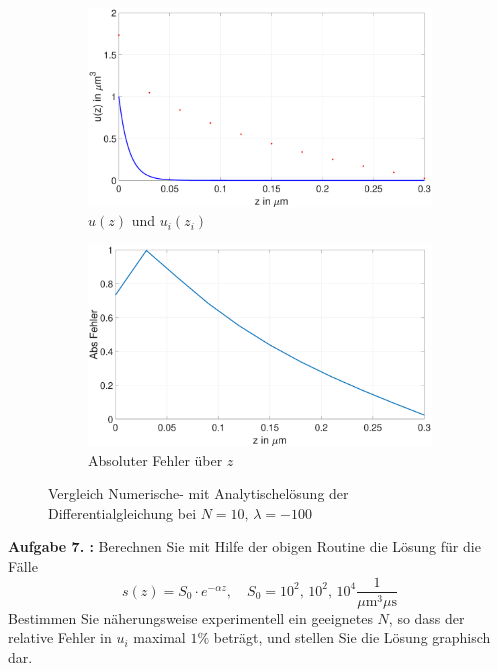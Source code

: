  \begin{figure}[]
 	\begin{subfigure}[b]{0.5\textwidth}
 		\includegraphics[width=\textwidth]{figures/station_gl_2_1/test_n10_l100}
 		\caption{$u(z)$ und $u_{i}(z_i)$}
 	\end{subfigure}
 	\hfill
 	\begin{subfigure}[b]{0.5\textwidth}
 		\includegraphics[width=1\linewidth]{figures/station_gl_2_1/test_n10_l100_fehler}
 		\caption{Absoluter Fehler über $z$}
 	\end{subfigure}
 	\caption{Vergleich Numerische- mit Analytischelösung der Differentialgleichung bei $N=10,\,\lambda=-100$}
\end{figure}
\begin{figure}
	
\end{figure}
\clearpage
\begin{mybox}
	\textbf{Aufgabe 7. :}	Berechnen Sie mit Hilfe der obigen Routine die Lösung
	für die Fälle
	\begin{equation}
		s(z)=S_0\cdot e^{-\alpha z}, \quad S_0=10^2, \, 10^2, \, 10^4
		\frac{1}{\si{\mu\meter^3 \mu \s}}
	\end{equation}
	Bestimmen Sie näherungsweise experimentell ein geeignetes $N$, so dass der
	relative Fehler in $u_i$
	maximal $1\%$ beträgt, und stellen Sie die Lösung graphisch dar.
\end{mybox}


